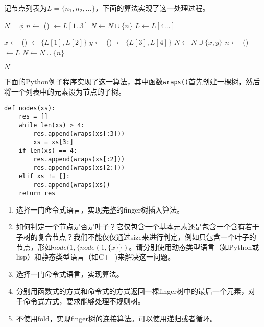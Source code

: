 \documentclass[UTF8]{article}
\begin{document}
记节点列表为$L=\{ n_1, n_2, ... \}$，下面的算法实现了这一处理过程。

\begin{algorithmic}
  \State $N = \phi$
    \State $n \gets$ ()
    \State {} $\gets L[1..3]$  
    \State $N \gets N \cup \{ n \}$
    \State $L \gets L[4...]$ 
  \EndWhile

    \State $x \gets$ ()
    \State {} $\gets \{L[1], L[2]\}$
    \State $y \gets$ ()
    \State {} $\gets \{L[3], L[4]\}$
    \State $N \gets N \cup \{ x, y \}$
    \State $n \gets$ ()
    \State {} $\gets L$
    \State $N \gets N \cup \{ n \}$
  \EndIf

  \State \Return $N$
\EndFunction
\end{algorithmic}

下面的Python例子程序实现了这一算法，其中函数\texttt{wraps()}首先创建一棵树，然后将一个列表中的元素设为节点的子树。

\begin{lstlisting}
def nodes(xs):
    res = []
    while len(xs) > 4:
        res.append(wraps(xs[:3]))
        xs = xs[3:]
    if len(xs) == 4:
        res.append(wraps(xs[:2]))
        res.append(wraps(xs[2:]))
    elif xs != []:
        res.append(wraps(xs))
    return res
\end{lstlisting}

\begin{Exercise}
\begin{enumerate}
\item 选择一门命令式语言，实现完整的finger树插入算法。

\item 如何判定一个节点是否是叶子？它仅包含一个基本元素还是包含一个含有若干子树的复合节点？我们不能仅仅通过size来进行判定，例如只包含一个叶子的节点，形如$node(1, \{node(1, \{x\}\})$。请分别使用动态类型语言（如Python或lisp）和静态类型语言（如C++)来解决这一问题。

\item 选择一门命令式语言，实现算法。

\item 分别用函数式的方式和命令式的方式返回一棵finger树中的最后一个元素，对于命令式方式，要求能够处理不规则树。

\item 不使用fold，实现finger树的连接算法。可以使用递归或者循环。
\end{enumerate}
\end{Exercise}
\end{document}
